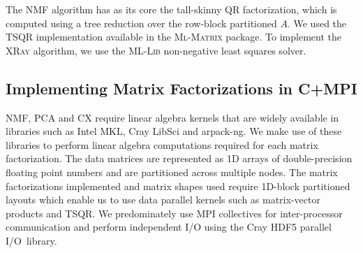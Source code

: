 The NMF algorithm has as its core the tall-skinny QR factorization, which is computed using a tree reduction over the row-block partitioned $A$.
We used the \textsc{TSQR} implementation available in the \textsc{Ml-Matrix} package. To implement the \textsc{XRay} algorithm, we use the \textsc{ML-Lib} non-negative least squares solver.


\subsection{Implementing Matrix Factorizations in C+MPI}
NMF, PCA and CX require linear algebra kernels that are widely available in libraries such as Intel MKL, Cray LibSci and arpack-ng. We make use of these libraries to perform linear algebra computations required for each matrix factorization. The data matrices are represented as 1D arrays of double-precision floating point numbers and are partitioned across multiple nodes. The matrix factorizations implemented and matrix shapes used require 1D-block partitioned layouts which enable us to use data parallel kernels such as matrix-vector products and TSQR. We predominately use MPI collectives for inter-processor communication and perform independent I/O using the Cray HDF5 parallel I/O~library.  